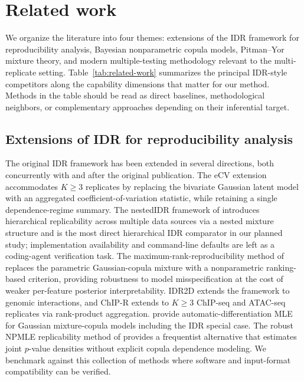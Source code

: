 \section{Related work}
\label{sec:related}

We organize the literature into four themes: extensions of the IDR framework for reproducibility analysis, Bayesian nonparametric copula models, Pitman--Yor mixture theory, and modern multiple-testing methodology relevant to the multi-replicate setting. Table~\ref{tab:related-work} summarizes the principal IDR-style competitors along the capability dimensions that matter for our method. Methods in the table should be read as direct baselines, methodological neighbors, or complementary approaches depending on their inferential target.



\subsection{Extensions of IDR for reproducibility analysis}

The original IDR framework \citep{LiBrownHuangBickel2011} has been extended in several directions, both concurrently with and after the original publication. The eCV extension \citep{Iakovidis2024eCV} accommodates $K \geq 3$ replicates by replacing the bivariate Gaussian latent model with an aggregated coefficient-of-variation statistic, while retaining a single dependence-regime summary. The nestedIDR framework of \citet{Ranalli2026nestedIDR} introduces hierarchical replicability across multiple data sources via a nested mixture structure and is the most direct hierarchical IDR comparator in our planned study; implementation availability and command-line defaults are left as a coding-agent verification task. The maximum-rank-reproducibility method of \citet{Philtron2018MaRR} replaces the parametric Gaussian-copula mixture with a nonparametric ranking-based criterion, providing robustness to model misspecification at the cost of weaker per-feature posterior interpretability. IDR2D \citep{Krismer2020IDR2D} extends the framework to genomic interactions, and ChIP-R \citep{Newell2021ChIPR} extends to $K \geq 3$ ChIP-seq and ATAC-seq replicates via rank-product aggregation. \citet{KasaRajan2020GMCM} provide automatic-differentiation MLE for Gaussian mixture-copula models including the IDR special case. The robust NPMLE replicability method of \citet{Yi2024NPMLE} provides a frequentist alternative that estimates joint $p$-value densities without explicit copula dependence modeling. We benchmark against this collection of methods where software and input-format compatibility can be verified.

